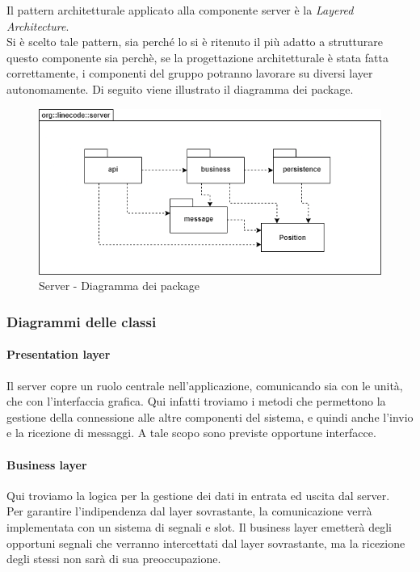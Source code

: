 Il pattern architetturale applicato alla componente server è la \textit{Layered Architecture}. \\
Si è scelto tale pattern, sia perché lo si è ritenuto il più adatto a strutturare questo componente sia perchè, se la progettazione architetturale è stata fatta correttamente, i componenti del gruppo potranno lavorare su diversi layer autonomamente. Di seguito viene illustrato il diagramma dei package.
\begin{figure}[H]
	\centering
	\includegraphics[width=12cm]{img/server_package.png}
	\caption{Server - Diagramma dei package}
\end{figure}

\subsubsection{Diagrammi delle classi}

\paragraph{Presentation layer}
Il server copre un ruolo centrale nell'applicazione, comunicando sia con le unità, che con l'interfaccia grafica. Qui infatti troviamo i metodi che permettono la gestione della connessione alle altre componenti del sistema, e quindi anche l'invio e la ricezione di messaggi. A tale scopo sono previste opportune interfacce.

\paragraph{Business layer}
Qui troviamo la logica per la gestione dei dati in entrata ed uscita dal server. \\
Per garantire l'indipendenza dal layer sovrastante, la comunicazione verrà implementata con un sistema di segnali e slot. Il business layer emetterà degli opportuni segnali che verranno intercettati dal layer sovrastante, ma la ricezione degli stessi non sarà di sua preoccupazione.


